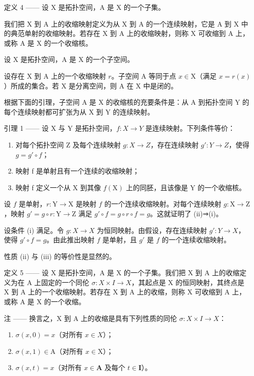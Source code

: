 定义 4 —— 设 X 是拓扑空间，A 是 X 的一个子集。

我们把 X 到 A 上的收缩映射定义为从 X 到 A 的一个连续映射，它是 A 到 X 中的典范单射的收缩映射。若存在 X 到 A 上的收缩映射，则称 X 可收缩到 A 上，或称 A 是 X 的一个收缩核。

设 X 是拓扑空间，A 是 X 的一个子空间。

设存在 X 到 A 上的一个收缩映射 \(r\)。子空间 A 等同于点 \(x \in \mathrm{X}\)（满足 \(x = r(x)\)）所成的集合。若 X 是分离空间，则 A 在 X 中是闭的。

根据下面的引理，子空间 A 是 X 的收缩核的充要条件是：从 A 到拓扑空间 Y 的每个连续映射都可扩张为从 X 到 Y 的连续映射。

引理 1 —— 设 X 与 Y 是拓扑空间，\(f\colon X\to Y\) 是连续映射。下列条件等价：

\begin{enumerate}
\def\labelenumi{(\roman{enumi})}
\item
  对每个拓扑空间 Z 及每个连续映射 \(g: X \to Z\)，存在连续映射 \(g': Y \to Z\)，使得 \(g = g' \circ f\)；
\item
  映射 f 是单射且有一个连续的收缩映射；
\item
  映射 f 定义一个从 X 到其像 \(f(\mathrm{X})\) 上的同胚，且该像是 Y 的一个收缩核。
\end{enumerate}

设 \(f\) 是单射，\(r: \mathrm{Y} \to \mathrm{X}\) 是映射 \(f\) 的一个连续收缩映射。对每个连续映射 \(g: \mathrm{X} \to \mathrm{Z}\)，映射 \(g' = g \circ r: \mathrm{Y} \to \mathrm{Z}\) 满足 \(g' \circ f = g \circ r \circ f = g\)。这就证明了 (ii)⇒(i)。

设条件 (i) 满足。令 \(g \colon X \to X\) 为恒同映射。由假设，存在连续映射 \(g' \colon Y \to X\)，使得 \(g' \circ f = g\)。由此推出映射 \(f\) 是单射，且 \(g'\) 是 \(f\) 的一个连续收缩映射。

性质 (ii) 与 (iii) 的等价性是显然的。

定义 5 —— 设 X 是拓扑空间，A 是 X 的一个子集。我们把 X 到 A 上的收缩定义为在 A 上固定的一个同伦 \(\sigma\colon X\times I\to X\)，其起点是 X 的恒同映射，其终点是 X 到 A 上的一个收缩映射。若存在 X 到 A 上的收缩，则称 X 可收缩到 A 上，或称 A 是 X 的一个收缩。

注 —— 换言之，X 到 A 上的收缩是具有下列性质的同伦 \(\sigma\colon X \times I \to X\)：

\begin{enumerate}
\def\labelenumi{(\roman{enumi})}
\item
  \(\sigma(x,0)=x\)（对所有 \(x\in X\)）；
\item
  \(\sigma(x,1)\in\mathrm{A}\)（对所有 \(x\in\mathrm{X}\)）；
\item
  \(\sigma(x,t)=x\)（对所有 \(x\in\mathbf{A}\) 及每个 \(t\in\mathbf{I}\)）。
\end{enumerate}

